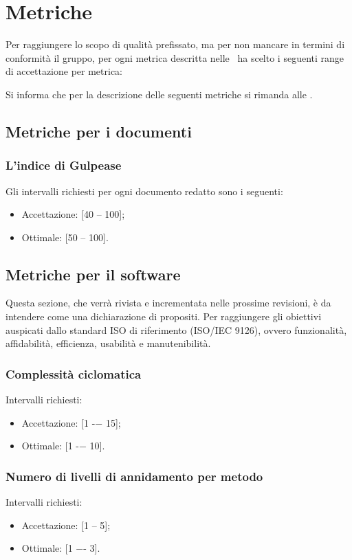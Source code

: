 \newpage

\section{Metriche}
Per raggiungere lo scopo di qualità prefissato, ma per non mancare in termini di conformità il gruppo, per ogni metrica descritta nelle \NdP\ ha scelto i seguenti range di accettazione per metrica:

Si informa che per la descrizione delle seguenti metriche si rimanda alle \NdP. \\


\subsection{Metriche per i documenti}

\subsubsection{L'indice di Gulpease}
Gli intervalli richiesti per ogni documento redatto sono i seguenti:
\begin{itemize}
\item Accettazione: [40 -- 100];
\item Ottimale: [50 -- 100].
\end{itemize}

\subsection{Metriche per il software}
Questa sezione, che verrà rivista e incrementata nelle prossime revisioni, è da intendere come una dichiarazione di propositi.
Per raggiungere gli obiettivi auspicati dallo standard ISO di riferimento (ISO/IEC 9126), ovvero funzionalità, affidabilità,
efficienza, usabilità e manutenibilità.


\subsubsection{Complessità ciclomatica}
Intervalli richiesti:
\begin{itemize}
\item
Accettazione: [1 -− 15];
\item
Ottimale: [1 -− 10].
\end{itemize}

\subsubsection{Numero di livelli di annidamento per metodo}
Intervalli richiesti:
\begin{itemize}
\item
Accettazione: [1 -- 5];
\item
Ottimale: [1 −- 3].
\end{itemize}

